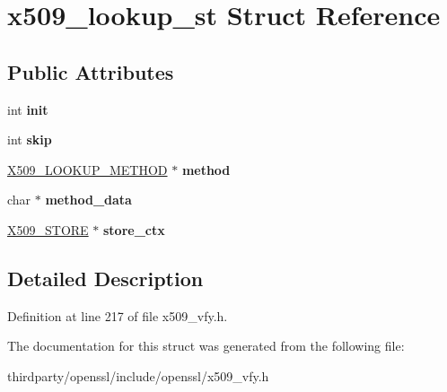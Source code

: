 \hypertarget{structx509__lookup__st}{}\section{x509\+\_\+lookup\+\_\+st Struct Reference}
\label{structx509__lookup__st}
\subsection*{Public Attributes}
\begin{DoxyCompactItemize}
\item 
\mbox{\label{structx509__lookup__st_a63b25b8fcf160eac9348b88e48eab9c1}} 
int {\bfseries init}
\item 
\mbox{\label{structx509__lookup__st_a8d1184cdc9e7f7c4d081a32df8b78a97}} 
int {\bfseries skip}
\item 
\mbox{\label{structx509__lookup__st_a84bf6103b3374899e01401931ee30eda}} 
\hyperlink{structx509__lookup__method__st}{X509\+\_\+\+L\+O\+O\+K\+U\+P\+\_\+\+M\+E\+T\+H\+OD} $\ast$ {\bfseries method}
\item 
\mbox{\label{structx509__lookup__st_a63bfeed761e0dd16a8fe59d6a3933cb4}} 
char $\ast$ {\bfseries method\+\_\+data}
\item 
\mbox{\label{structx509__lookup__st_a91fff2cdf32522eb0b037bdb9cdf2e53}} 
\hyperlink{structx509__store__st}{X509\+\_\+\+S\+T\+O\+RE} $\ast$ {\bfseries store\+\_\+ctx}
\end{DoxyCompactItemize}


\subsection{Detailed Description}


Definition at line 217 of file x509\+\_\+vfy.\+h.



The documentation for this struct was generated from the following file\+:\begin{DoxyCompactItemize}
\item 
thirdparty/openssl/include/openssl/x509\+\_\+vfy.\+h\end{DoxyCompactItemize}
